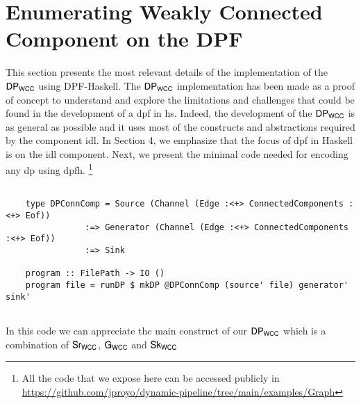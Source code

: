 %
\section{Enumerating Weakly Connected Component on the DPF}\label{sec:wcc-dpf}
This section presents the most relevant details of the implementation of the $\mathsf{DP_{WCC}}$ using DPF-Haskell. The $\mathsf{DP_{WCC}}$ implementation has been made as a proof of concept to understand and explore
the limitations and challenges that could be found in the development of a \acrshort{dpf} in \acrshort{hs}.  Indeed, the development of the $\mathsf{DP_{WCC}}$ is as general as possible and it uses most of the constructs and abstractions required by the component \acrshort{idl}. In Section 4, we emphasize that the focus of \acrshort{dpf} in Haskell is on the \acrshort{idl} component. Next, we present the minimal code needed for encoding any \acrshort{dp} using \acrshort{dpfh}. \footnote{All the code that we expose here can be accessed publicly in \url{https://github.com/jproyo/dynamic-pipeline/tree/main/examples/Graph}}

\begin{listing}[H]
  \begin{verbatim}
    
    type DPConnComp = Source (Channel (Edge :<+> ConnectedComponents :<+> Eof))
                :=> Generator (Channel (Edge :<+> ConnectedComponents :<+> Eof))
                :=> Sink

    program :: FilePath -> IO ()
    program file = runDP $ mkDP @DPConnComp (source' file) generator' sink'
        
  \end{verbatim}
  \caption[{[\texttt{ConnectedComp.hs}] Main entry point of the program}]{In this code we can appreciate the main construct of our $\dpwcc$ which is a combination of $\iwc$, $\gwc$ and $\owc$}
  \label{src:dpwcc:1}
\end{listing}

